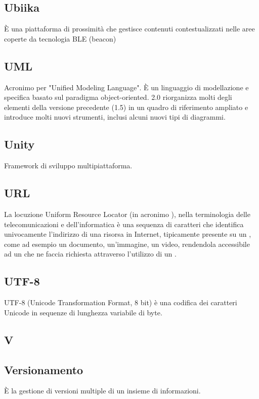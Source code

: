 \subsection{Ubiika}
È una piattaforma di prossimità che gestisce contenuti contestualizzati nelle
aree coperte da tecnologia BLE (beacon)​

\subsection{UML}
Acronimo per "Unified Modeling Language". È un linguaggio di modellazione e
specifica basato sul paradigma object-oriented.  2.0 riorganizza molti degli
elementi della versione precedente (1.5) in un quadro di riferimento ampliato e
introduce molti nuovi strumenti, inclusi alcuni nuovi tipi di diagrammi.

\subsection{Unity}
Framework di sviluppo multipiattaforma.

\subsection{URL}
La locuzione Uniform Resource Locator (in acronimo ), nella terminologia delle telecomunicazioni e dell'informatica è una sequenza di caratteri che identifica univocamente l'indirizzo di una risorsa in Internet, tipicamente presente su un  , come ad esempio un documento, un'immagine, un video, rendendola accessibile ad un  che ne faccia richiesta attraverso l'utilizzo di un  .

\subsection{UTF-8}
UTF-8 (Unicode Transformation Format, 8 bit) è una codifica dei caratteri Unicode in sequenze di lunghezza variabile di byte.

\newpage

\begin{center}
\Huge\section{\uppercase{V}}
\end{center}

\subsection{Versionamento}
È la gestione di versioni multiple di un insieme di informazioni.

